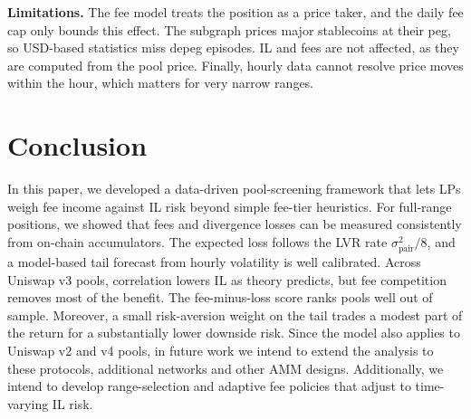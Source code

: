\documentclass[10pt,conference,compsocconf]{IEEEtran}
\begin{document}
\textbf{Limitations.} The fee model treats the position as a price taker, and the daily fee cap only bounds this effect. The subgraph prices major stablecoins at their peg, so USD-based statistics miss depeg episodes. IL and fees are not affected, as they are computed from the pool price. Finally, hourly data cannot resolve price moves within the hour, which matters for very narrow ranges.

\section{Conclusion}
\label{sec:conclusion}
In this paper, we developed a data-driven pool-screening framework that lets LPs weigh fee income against IL risk beyond simple fee-tier heuristics. For full-range positions, we showed that fees and divergence losses can be measured consistently from on-chain accumulators. The expected loss follows the LVR rate $\sigma^2_{\text{pair}}/8$, and a model-based tail forecast from hourly volatility is well calibrated. Across \NPools{} Uniswap v3 pools, correlation lowers IL as theory predicts, but fee competition removes most of the benefit. The fee-minus-loss score ranks pools well out of sample. Moreover, a small risk-aversion weight on the tail trades a modest part of the return for a substantially lower downside risk. Since the model also applies to Uniswap v2 and v4 pools, in future work we intend to extend the analysis to these protocols, additional networks and other AMM designs. Additionally, we intend to develop range-selection and adaptive fee policies that adjust to time-varying IL risk.





\end{document}
